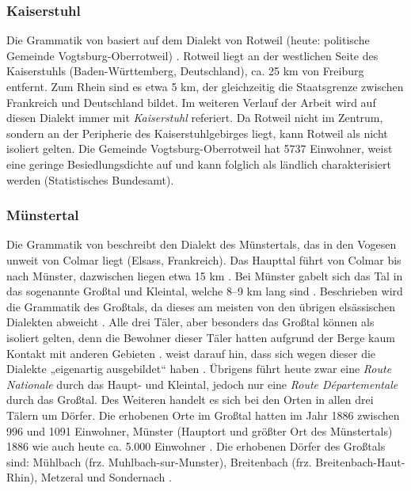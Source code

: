 \subsubsection{Kaiserstuhl}

Die Grammatik von \citet{Noth1993} basiert auf dem Dialekt von Rotweil (heute: politische Gemeinde Vogtsburg-Oberrotweil) \citep[293]{Noth1993}. Rotweil liegt an der westlichen Seite des Kaiserstuhls (Ba\-den-Würt\-tem\-berg, Deutschland), ca. 25 km von Freiburg entfernt. Zum Rhein sind es etwa 5 km, der gleichzeitig die Staatsgrenze zwischen Frankreich und Deutschland bildet. Im weiteren Verlauf der Arbeit wird auf diesen Dialekt immer mit \textit{Kaiserstuhl} referiert. Da Rotweil nicht im Zentrum, sondern an der Peripherie des Kaiserstuhlgebirges liegt, kann Rotweil als nicht isoliert gelten. Die Gemeinde Vogtsburg-Oberrotweil hat 5737 Einwohner, weist eine geringe Besiedlungsdichte auf und kann folglich als ländlich charakterisiert werden (Statistisches Bundesamt).

\subsubsection{Münstertal}

Die Grammatik von \citet{Mankel1886} beschreibt den Dialekt des Münstertals, das in den Vogesen unweit von Colmar liegt (Elsass, Frankreich). Das Haupttal führt von Colmar bis nach Münster, dazwischen liegen etwa 15 km \citep[1]{Mankel1886}. Bei Münster gabelt sich das Tal in das sogenannte Großtal und Kleintal, welche 8–9 km lang sind \citep[1]{Mankel1886}. Beschrieben wird die Grammatik des Großtals, da dieses am meisten von den übrigen elsässischen Dialekten abweicht \citep[2]{Mankel1886}. Alle drei Täler, aber besonders das Großtal können als isoliert gelten, denn die Bewohner dieser Täler hatten aufgrund der Berge kaum Kontakt mit anderen Gebieten \citep[1]{Mankel1886}. \citet{Mankel1886} weist darauf hin, dass sich wegen dieser  die Dialekte „eigenartig ausgebildet“ haben \citep[1]{Mankel1886}. Übrigens führt heute zwar eine \textit{Route Nationale} durch das Haupt- und Kleintal, jedoch nur eine \textit{Route Départementale} durch das Großtal. Des Weiteren handelt es sich bei den Orten in allen drei Tälern um Dörfer. Die erhobenen Orte im Großtal hatten im Jahr 1886 zwischen 996 und 1091 Einwohner, Münster (Hauptort und größter Ort des Münstertals) 1886 wie auch heute ca. 5.000 Einwohner \citep{MotteVouloirSarrabezolles2015}. Die erhobenen Dörfer des Großtals sind: Mühlbach (frz. Muhlbach-sur-Munster), Breitenbach (frz. Breitenbach-Haut-Rhin), Metzeral und Sondernach \citep[2]{Mankel1886}.

